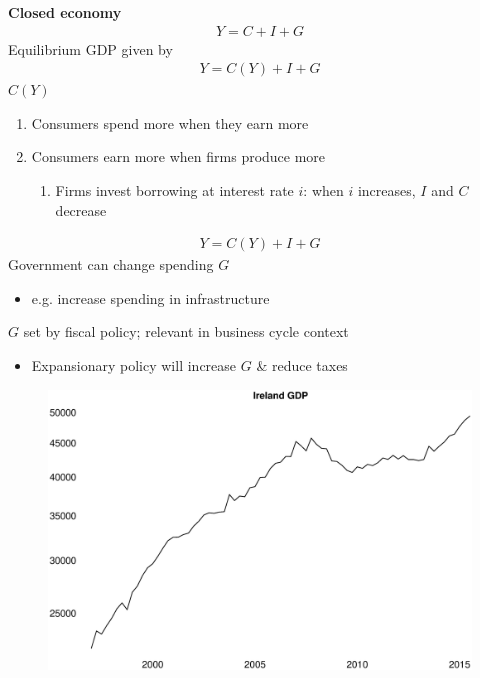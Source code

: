 \documentclass{beamer}
\begin{document}
\begin{frame}
  \textbf{Closed economy}
  \begin{align}
    Y=C+I+G
  \end{align}
  \medskip
  Equilibrium GDP given by
  \begin{align}
    Y=C(Y) + I +G
  \end{align}
  $C(Y)$
  \begin{enumerate}
    \item Consumers spend more when they earn more
    \item Consumers earn more when firms produce more
    \begin{enumerate}
      \item Firms invest borrowing at interest rate $i$: when $i$ increases, $I$ and $C$ decrease   
    \end{enumerate}
  \end{enumerate}
\end{frame}

\begin{frame}
  \begin{align*}
    Y=C(Y) + I + G
  \end{align*}
  \medskip
  Government can change spending $G$
  \begin{itemize}
    \item e.g. increase spending in infrastructure
  \end{itemize}
  \medskip
  $G$ set by fiscal policy; relevant in business cycle context
  \begin{itemize}
    \item Expansionary policy will increase $G$ \& reduce taxes
  \end{itemize}
\end{frame}

\begin{frame}
  \begin{figure}
    \includegraphics[scale=.25]{ire_gdp.eps}
  \end{figure}
\end{frame}
\end{document}
